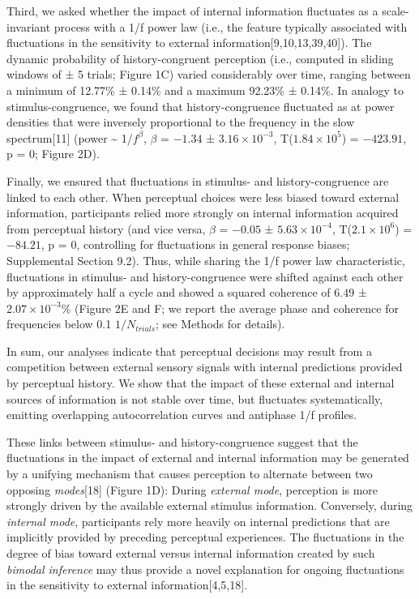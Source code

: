 \documentclass[
]{article}
\begin{document}
Third, we asked whether the impact of internal information fluctuates as
a scale-invariant process with a 1/f power law (i.e., the feature
typically associated with fluctuations in the sensitivity to external
information{[}9,10,13,39,40{]}). The dynamic probability of
history-congruent perception (i.e., computed in sliding windows of ± 5
trials; Figure 1C) varied considerably over time, ranging between a
minimum of 12.77\% ± 0.14\% and a maximum 92.23\% ± 0.14\%. In analogy
to stimulus-congruence, we found that history-congruence fluctuated as
at power densities that were inversely proportional to the frequency in
the slow spectrum{[}11{]} (power \textasciitilde{} 1/\(f^\beta\),
\(\beta\) = \(-1.34\) ± \(\ensuremath{3.16\times 10^{-3}}\),
T(\(\ensuremath{1.84\times 10^{5}}\)) = \(-423.91\), p = \(0\); Figure
2D).

Finally, we ensured that fluctuations in stimulus- and
history-congruence are linked to each other. When perceptual choices
were less biased toward external information, participants relied more
strongly on internal information acquired from perceptual history (and
vice versa, \(\beta\) = \(-0.05\) ± \(\ensuremath{5.63\times 10^{-4}}\),
T(\(\ensuremath{2.1\times 10^{6}}\)) = \(-84.21\), p = \(0\),
controlling for fluctuations in general response biases; Supplemental
Section 9.2). Thus, while sharing the 1/f power law characteristic,
fluctuations in stimulus- and history-congruence were shifted against
each other by approximately half a cycle and showed a squared coherence
of \(6.49\) ± \(\ensuremath{2.07\times 10^{-3}}\)\% (Figure 2E and F; we
report the average phase and coherence for frequencies below 0.1
\(1/N_{trials}\); see Methods for details).

In sum, our analyses indicate that perceptual decisions may result from
a competition between external sensory signals with internal predictions
provided by perceptual history. We show that the impact of these
external and internal sources of information is not stable over time,
but fluctuates systematically, emitting overlapping autocorrelation
curves and antiphase 1/f profiles.

These links between stimulus- and history-congruence suggest that the
fluctuations in the impact of external and internal information may be
generated by a unifying mechanism that causes perception to alternate
between two opposing \emph{modes}{[}18{]} (Figure 1D): During
\emph{external mode}, perception is more strongly driven by the
available external stimulus information. Conversely, during
\emph{internal mode}, participants rely more heavily on internal
predictions that are implicitly provided by preceding perceptual
experiences. The fluctuations in the degree of bias toward external
versus internal information created by such \emph{bimodal inference} may
thus provide a novel explanation for ongoing fluctuations in the
sensitivity to external information{[}4,5,18{]}.
\end{document}

